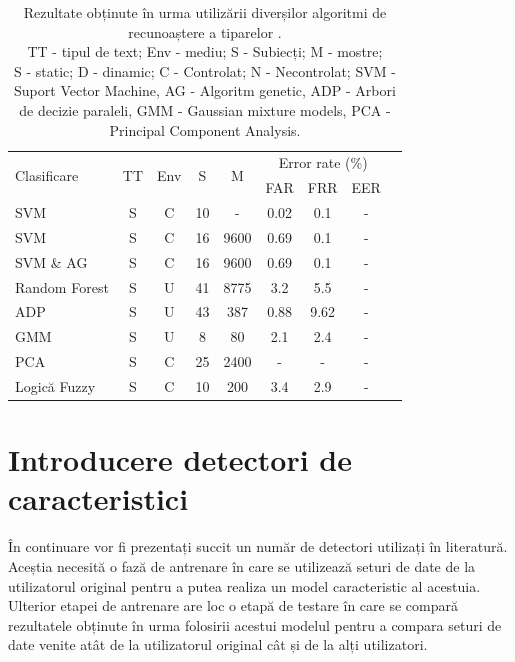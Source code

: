 \documentclass[9pt,shortpaper,twoside,web]{ieeecolor}
\begin{document}
\begin{table}[H]
	\begin{tabular}[c]{lcccccccc}
	\hline
	\multirow{2}{*}{Clasificare} & \multirow{2}{*}{TT} & \multirow{2}{*}{Env} & \multirow{2}{*}{S} & \multirow{2}{*}{M} & \multicolumn{3}{c}{Error rate (\%)} \\
	\cline{6-8}
            &    &     &   &   &  FAR & FRR & EER \\
	\hline
	SVM	             				& S & C &  10 &    - & 0.02 &  0.1   & - \\
	SVM	             				& S & C &  16 & 9600 & 0.69 &  0.1   & - \\
	SVM	\& AG          				& S & C &  16 & 9600 & 0.69 &  0.1   & - \\
	Random Forest	  				& S & U &  41 & 8775 & 3.2  &  5.5   & - \\
	ADP								& S & U &  43 &  387 & 0.88 &  9.62  & - \\
	GMM				  				& S & U &   8 &   80 & 2.1  &  2.4   & - \\
	PCA 	 		  				& S & C &  25 & 2400 & -    &  -     & - \\
	Logică Fuzzy	  				& S & C &  10 &  200 & 3.4  &  2.9   & - \\
	
	\hline
	\end{tabular}
	
\caption{
Rezultate obținute în urma utilizării diverșilor algoritmi de recunoaștere a tiparelor \cite{b3}.\\
TT - tipul de text; Env - mediu; S - Subiecți; M - mostre;\\
S - static; D - dinamic; C - Controlat; N - Necontrolat;
SVM - Suport Vector Machine, AG - Algoritm genetic, ADP - Arbori de decizie paraleli, GMM - Gaussian mixture models, PCA - Principal Component Analysis.
}
\end{table}

\section{Introducere detectori de caracteristici}
	În continuare vor fi prezentați succit un număr de detectori utilizați în literatură. Aceștia necesită o fază de antrenare în care se utilizează seturi de date de la utilizatorul original pentru a putea realiza un model caracteristic al acestuia. Ulterior etapei de antrenare are loc o etapă de testare în care se compară rezultatele obținute în urma folosirii acestui modelul pentru a compara seturi de date venite atât de la utilizatorul original cât și de la alți utilizatori.
	
\end{document}
